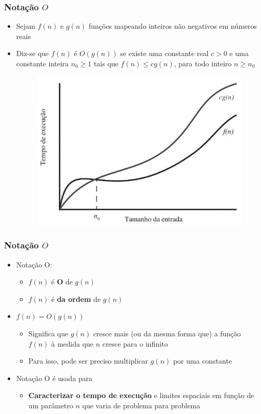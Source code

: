 \documentclass[aspectratio=169]{beamer}
\begin{document}
\begin{frame}\frametitle{Notação $O$}
\begin{itemize}
	\item Sejam $f(n)$ e $g(n)$ funções mapeando inteiros não negativos em números reais
	\item Diz-se que $f(n)$ é $O(g(n))$ se existe uma constante real $c > 0$ e uma constante inteira $n_0 \ge 1$ tais que
$f(n) \le cg(n)$, para todo inteiro $n \ge n_0$
\begin{figure}[h]
	\centering
	\includegraphics[height=0.5\paperheight]{imagens/grafico_fx_gx.jpg}
\end{figure}
\end{itemize}
\end{frame}

\begin{frame}\frametitle{Notação $O$}
\begin{itemize}
	\item Notação O:
	\begin{itemize}
		\item $f(n)$ é \textbf{O} de $g(n)$
		\item $f(n)$ é \textbf{da ordem} de $g(n)$
	\end{itemize}
	\item $f(n)=O(g(n))$
	\begin{itemize}
		\item Significa que $g(n)$ cresce mais (ou da mesma forma que) a função $f(n)$ à medida que $n$ cresce para o infinito
		\item Para isso, pode ser preciso multiplicar $g(n)$ por uma constante
	\end{itemize}
	\item Notação O é usada para
	\begin{itemize}
		\item \textbf{Caracterizar o tempo de execução} e limites espaciais em função de um parâmetro $n$ que varia de problema para problema
	\end{itemize}
\end{itemize}
\end{frame}
\end{document}
